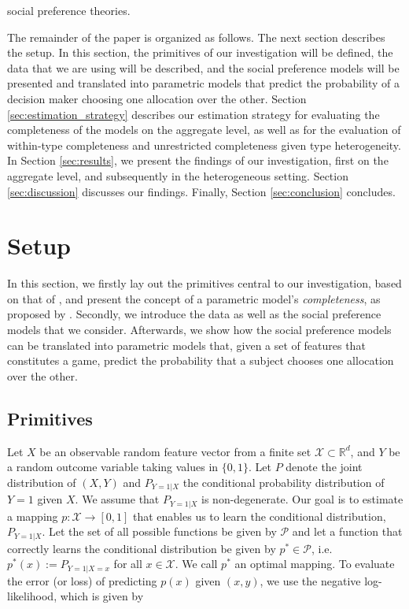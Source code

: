 \documentclass[11pt,a4paper]{article}
\theoremstyle{definition}
\begin{document}
social preference theories.

The remainder of the paper is organized as follows. The next section describes the setup. In this section, the primitives of our investigation will be defined, the data that we are using will be described, and the social preference models will be presented and translated into parametric models that predict the probability of a decision maker choosing one allocation over the other. Section \ref{sec:estimation_strategy} describes our estimation strategy for evaluating the completeness of the models on the aggregate level, as well as for the evaluation of within-type completeness and unrestricted completeness given type heterogeneity. In Section \ref{sec:results}, we present the findings of our investigation, first on the aggregate level, and subsequently in the heterogeneous setting. Section \ref{sec:discussion} discusses our findings. Finally, Section \ref{sec:conclusion} concludes.

\section{Setup}
\label{sec:setup}
In this section, we firstly lay out the primitives central to our investigation, based on that of \citet{Fudenberg2021a}, and present the concept of a parametric model's \emph{completeness},  as proposed by \citet{Fudenberg2021b}. Secondly, we introduce the data as well as the social preference models that we consider. Afterwards, we show how the social preference models can be translated into parametric models that, given a set of features that constitutes a game, predict the probability that a subject chooses one allocation over the other.

\subsection{Primitives}
\label{subsec:primitives}
Let $X$ be an observable random feature vector from a finite set $\mathcal{X}\subset \mathbb{R}^{d}$, and $Y$ be a random outcome variable taking values in $\{0,1\}$. Let $P$ denote the joint distribution of $(X,Y)$ and $P_{Y=1|X}$ the conditional probability distribution of $Y=1$ given $X$. We assume that $P_{Y=1|X}$ is non-degenerate. Our goal is to estimate a mapping $p:\mathcal{X}\to[0,1]$ that enables us to learn the conditional distribution, $P_{Y=1|X}$. Let the set of all possible functions be given by $\mathcal{P}$ and let a function that correctly learns the conditional distribution be given by $p^{*}\in\mathcal{P}$, i.e. $p^{*}(x):=P_{Y=1|X=x}$ for all $x\in\mathcal{X}$. We call $p^{*}$ an optimal mapping. To evaluate the error (or loss) of predicting $p(x)$ given $(x,y)$, we use the negative log-likelihood, which is given by
\end{document}
